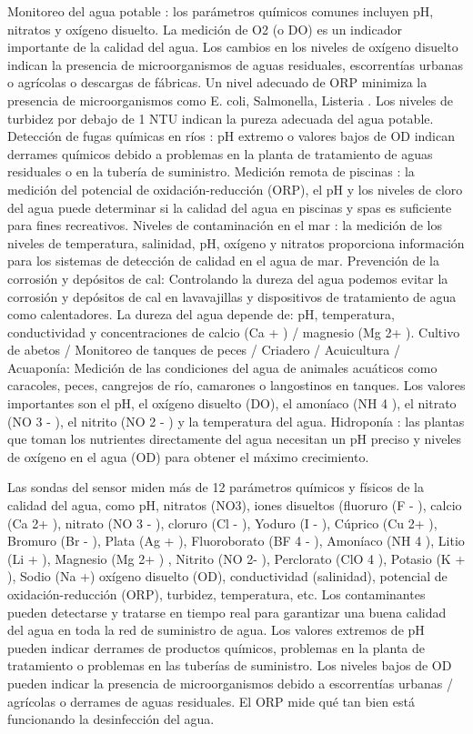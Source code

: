 Monitoreo del agua potable : los parámetros químicos comunes incluyen pH, nitratos y oxígeno disuelto. 
La medición de O2 (o DO) es un indicador importante de la calidad del agua. 
Los cambios en los niveles de oxígeno disuelto indican la presencia de microorganismos de aguas residuales, escorrentías urbanas o agrícolas o descargas de fábricas. 
Un nivel adecuado de ORP minimiza la presencia de microorganismos como  E. coli, Salmonella, Listeria . 
Los niveles de turbidez por debajo de 1 NTU indican la pureza adecuada del agua potable.
Detección de fugas químicas en ríos : pH extremo o valores bajos de OD indican derrames químicos debido a problemas en la planta de tratamiento de aguas residuales o en la tubería de suministro.
Medición remota de piscinas : la medición del potencial de oxidación-reducción (ORP), el pH y los niveles de cloro del agua puede determinar si la calidad del agua en piscinas y spas es suficiente para fines recreativos.
Niveles de contaminación en el mar : la medición de los niveles de temperatura, salinidad, pH, oxígeno y nitratos proporciona información para los sistemas de detección de calidad en el agua de mar.
Prevención de la corrosión y depósitos de cal:  Controlando la dureza del agua podemos evitar la corrosión y depósitos de cal en lavavajillas y dispositivos de tratamiento de agua como calentadores. 
La dureza del agua depende de: pH, temperatura, conductividad y concentraciones de calcio (Ca + ) / magnesio (Mg 2+ ).
Cultivo de abetos / Monitoreo de tanques de peces / Criadero / Acuicultura / Acuaponía: Medición de las condiciones del agua de animales acuáticos como caracoles, peces, cangrejos de río, camarones o langostinos en tanques. 
Los valores importantes son el pH, el oxígeno disuelto (DO), el amoníaco (NH 4 ), el nitrato (NO 3 - ), el nitrito (NO 2 - ) y la temperatura del agua.
Hidroponía : las plantas que toman los nutrientes directamente del agua necesitan un pH preciso y niveles de oxígeno en el agua (OD) para obtener el máximo crecimiento.

Las sondas del sensor miden más de 12 parámetros químicos y físicos de la calidad del agua, como pH, nitratos (NO3), iones disueltos (fluoruro (F - ), calcio (Ca 2+ ), nitrato (NO 3 - ), cloruro (Cl - ), Yoduro (I - ), Cúprico (Cu 2+ ), Bromuro (Br - ), Plata (Ag + ), Fluoroborato (BF 4 - ), Amoníaco (NH 4 ), Litio (Li + ), Magnesio (Mg 2+ ) , Nitrito (NO 2- ), Perclorato (ClO 4 ), Potasio (K + ), Sodio (Na +) oxígeno disuelto (OD), conductividad (salinidad), potencial de oxidación-reducción (ORP), turbidez, temperatura, etc. Los contaminantes pueden detectarse y tratarse en tiempo real para garantizar una buena calidad del agua en toda la red de suministro de agua. Los valores extremos de pH pueden indicar derrames de productos químicos, problemas en la planta de tratamiento o problemas en las tuberías de suministro. Los niveles bajos de OD pueden indicar la presencia de microorganismos debido a escorrentías urbanas / agrícolas o derrames de aguas residuales. El ORP mide qué tan bien está funcionando la desinfección del agua.

